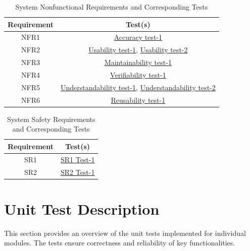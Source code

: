 \documentclass[12pt, titlepage]{article}
\begin{document}
\begin{table}[h!]
  \centering
    \begin{tabular}{|c|c|}
      \hline
      \textbf{Requirement} & \textbf{Test(s)} \\ \hline
      NFR1 & \textcolor{blue}{\hyperlink{Accuracy test-1}{Accuracy test-1}}  \\ \hline
      NFR2 & \textcolor{blue}{\hyperlink{Usability test-1}{Usability test-1}}, \textcolor{blue}{\hyperlink{Usability test-2}{Usability test-2}} \\ \hline
      NFR3 & \textcolor{blue}{\hyperlink{Maintainability test-1}{Maintainability test-1}}\\ \hline
      NFR4 & \textcolor{blue}{\hyperlink{Verifiability test-1}{Verifiability test-1}} \\ \hline
      NFR5 & \textcolor{blue}{\hyperlink{Understandability test-1}{Understandability test-1}}, \textcolor{blue}{\hyperlink{Understandability test-2}{Understandability test-2}} \\ \hline
      NFR6 & \textcolor{blue}{\hyperlink{Reusability test-1}{Reusability test-1}} \\ \hline
      \end{tabular}
      \caption{System Nonfunctional Requirements and Corresponding Tests}
      \label{tab:requirements_tests}
  \end{table}

  \begin{table}[h!]
    \centering
      \begin{tabular}{|c|c|}
        \hline
        \textbf{Requirement} & \textbf{Test(s)} \\ \hline
        SR1 & \textcolor{blue}{\hyperlink{SR1 Test-1}{SR1 Test-1}}  \\ \hline
        SR2 & \textcolor{blue}{\hyperlink{SR2 Test-1}{SR2 Test-1}}\\ \hline
        \end{tabular}
        \caption{System Safety Requirements and Corresponding Tests}
        \label{tab:requirements_tests}
    \end{table}

\newpage

\section{Unit Test Description}
This section provides an overview of the unit tests implemented for individual modules. The tests ensure correctness and reliability of key functionalities.
\end{document}
